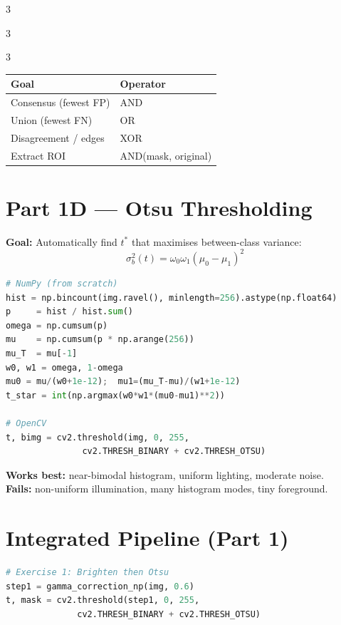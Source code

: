 \documentclass[9pt,landscape,a4paper]{extarticle}
\begin{document}
\begin{multicols*}{3}
\begin{multicols*}{3}
\begin{multicols}{3}
\begin{center}
\begin{tabular}{@{}ll@{}}
\toprule
Goal & Operator \\
\midrule
Consensus (fewest FP) & AND \\
Union (fewest FN) & OR \\
Disagreement / edges & XOR \\
Extract ROI & AND(mask, original) \\
\bottomrule
\end{tabular}
\end{center}

\section{Part 1D — Otsu Thresholding}

\textbf{Goal:} Automatically find $t^*$ that maximises between-class variance:
\[
  \sigma_b^2(t) = \omega_0 \omega_1 (\mu_0 - \mu_1)^2
\]

\begin{lstlisting}[language=Python]
# NumPy (from scratch)
hist = np.bincount(img.ravel(), minlength=256).astype(np.float64)
p     = hist / hist.sum()
omega = np.cumsum(p)
mu    = np.cumsum(p * np.arange(256))
mu_T  = mu[-1]
w0, w1 = omega, 1-omega
mu0 = mu/(w0+1e-12);  mu1=(mu_T-mu)/(w1+1e-12)
t_star = int(np.argmax(w0*w1*(mu0-mu1)**2))

# OpenCV
t, bimg = cv2.threshold(img, 0, 255,
               cv2.THRESH_BINARY + cv2.THRESH_OTSU)
\end{lstlisting}

\begin{notebox}
\textbf{Works best:} near-bimodal histogram, uniform lighting, moderate noise. \\
\textbf{Fails:} non-uniform illumination, many histogram modes, tiny foreground.
\end{notebox}

\section{Integrated Pipeline (Part 1)}

\begin{lstlisting}[language=Python]
# Exercise 1: Brighten then Otsu
step1 = gamma_correction_np(img, 0.6)
t, mask = cv2.threshold(step1, 0, 255,
              cv2.THRESH_BINARY + cv2.THRESH_OTSU)


\end{lstlisting}
\end{multicols}
\end{multicols*}
\end{multicols*}
\end{document}
